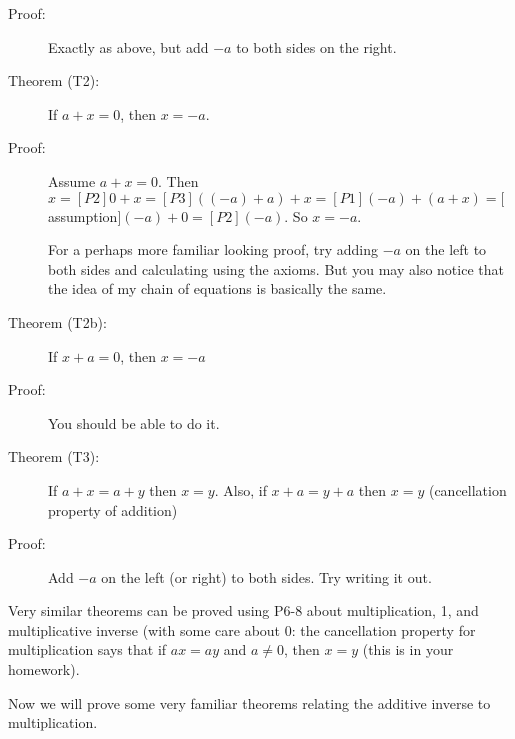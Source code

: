 \documentclass[12pt]{article}
\begin{document}
\begin{description}
\item[Proof:]  Exactly as above, but add $-a$ to both sides on the right.

\item[Theorem (T2):]  If $a+x=0$, then $x=-a$.

\item[Proof:]  Assume $a+x=0$.  Then $x=[P2]0+x=[P3]((-a)+a)+x =[P1](-a)+(a+x)=[$assumption$](-a)+0 =[P2](-a)$.
So $x=-a$.

For a perhaps more familiar looking proof, try adding $-a$ on the left to both sides and calculating using the axioms.  But you may also notice that the idea of my chain of equations is basically the same.

\item[Theorem (T2b):]  If $x+a=0$, then $x=-a$

\item[Proof:]  You should be able to do it.

\item[Theorem (T3):]  If $a+x=a+y$ then $x=y$.  Also, if $x+a=y+a$ then $x=y$ (cancellation property of addition)

\item[Proof:]  Add $-a$ on the left (or right) to both sides.  Try writing it out.

\end{description}

Very similar theorems can be proved using P6-8 about multiplication, 1, and multiplicative inverse (with some care about 0:
the cancellation property for multiplication says that if $ax=ay$ and $a \neq 0$, then $x=y$ (this is in your homework).

Now we will prove some very familiar theorems relating the additive inverse to multiplication.
\end{document}
